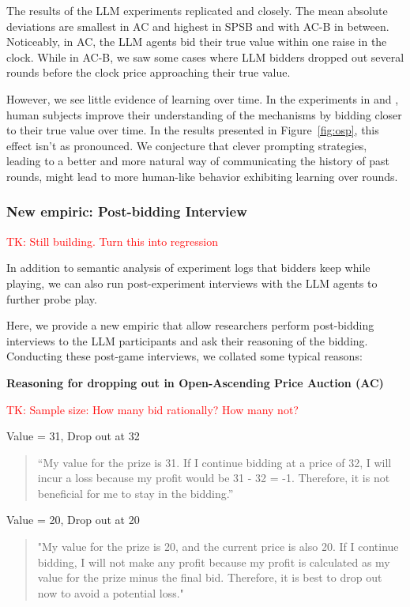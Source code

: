 \documentclass{article} %
\newcommand{\TK}[1]{\textcolor{red}{TK: #1}}
\begin{document}
The results of the LLM experiments replicated \cite{li2017obviously} and \citet{breitmoser2022obviousness} closely. The mean absolute deviations are smallest in AC and highest in SPSB and with AC-B in between.
Noticeably, in AC, the LLM agents bid their true value within one raise in the clock. While in AC-B, we saw some cases where LLM bidders dropped out several rounds before the clock price approaching their true value.

However, we see little evidence of learning over time. 
In the experiments in \citet{li2017obviously} and \citet{breitmoser2022obviousness}, human subjects improve their understanding of the mechanisms by bidding closer to their true value over time. 
In the results presented in Figure~\ref{fig:osp}, this effect isn't as pronounced. 
We conjecture that clever prompting strategies, leading to a better and more natural way of communicating the history of past rounds, might lead to more human-like behavior exhibiting learning over rounds.

\subsubsection{New empiric: Post-bidding Interview}
\TK{Still building. Turn this into regression}



In addition to semantic analysis of experiment logs that bidders keep while playing, we can also run post-experiment interviews with the LLM agents to further probe play.

Here, we provide a new empiric that allow researchers perform post-bidding interviews to the LLM participants and ask their reasoning of the bidding. 
Conducting these post-game interviews, we collated some typical reasons:

\textbf{Reasoning for dropping out in Open-Ascending Price Auction (AC)}

\TK{Sample size: 
How many bid rationally?
How many not?}

Value = 31, Drop out at 32
\begin{quote}
    “My value for the prize is 31. If I continue bidding at a price of 32, I will incur a loss because my profit would be 31 - 32 = -1. Therefore, it is not beneficial for me to stay in the bidding.”
\end{quote}

Value = 20, Drop out at 20
\begin{quote}
    "My value for the prize is 20, and the current price is also 20. If I continue bidding, I will not make any profit because my profit is calculated as my value for the prize minus the final bid. Therefore, it is best to drop out now to avoid a potential loss."
\end{quote}
\end{document}
